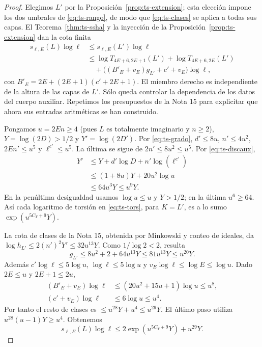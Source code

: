\begin{proof}
Elegimos $L'$ por la Proposición~\ref{prop:ts-extension}; esta elección impone los dos umbrales de \eqref{eq:ts-rango}, de modo que \eqref{eq:ts-clases} se aplica a todas sus capas. El Teorema~\ref{thm:ts-ssha} y la inyección de la Proposición~\ref{prop:ts-extension} dan la cota finita
\[
 \begin{aligned}
 s_{\ell,E}(L)\log\ell&\le s_{\ell,E}(L')\log\ell\\
 &\le\log T_{4E+6,2E+1}(L')+\log T_{4E+6,2E}(L')\\
 &\quad+\bigl((B'_E+v_E)g_{L'}+c'+v_E\bigr)\log\ell,
 \end{aligned}
\]
con $B'_E=2E+(2E+1)(c'+2E+1)$. El miembro derecho es independiente de la altura de las capas de $L'$. Sólo queda controlar la dependencia de los datos del cuerpo auxiliar. Repetimos los presupuestos de la Nota 15 para explicitar que ahora sus entradas aritméticas se han construido.

Pongamos $u=2En\ge4$ (pues $L$ es totalmente imaginario y $n\ge2$), $Y=\log(2D)>1/2$ y $Y'=\log(2D')$. Por \eqref{eq:ts-grado}, $d'\le8u$, $n'\le4u^2$, $2En'\le u^5$ y $\ell^{c'}\le u^5$. La última se sigue de $2n'\le8u^2\le u^5$. Por \eqref{eq:ts-discaux},
\[
 \begin{aligned}
 Y'&\le Y+d'\log D+n'\log(\ell^{c'})\\
 &\le(1+8u)Y+20u^2\log u\\
 &\le64u^3Y\le u^9Y.
 \end{aligned}
\]
En la penúltima desigualdad usamos $\log u\le u$ y $Y>1/2$; en la última $u^6\ge64$. Así cada logaritmo de torsión en \eqref{eq:ts-tors}, para $K=L'$, es a lo sumo $\exp(u^{5C_T+9}Y)$.

La cota de clases de la Nota 15, obtenida por Minkowski y conteo de ideales, da $\log h_{L'}\le2(n')^2Y'\le32u^{13}Y$. Como $1/\log2<2$, resulta
\[
 g_{L'}\le8u^2+2+64u^{13}Y\le81u^{13}Y\le u^{20}Y.
\]
Además $c'\log\ell\le5\log u$, $\log\ell\le5\log u$ y $v_E\log\ell\le\log E\le\log u$. Dado $2E\le u$ y $2E+1\le2u$,
\[
 \begin{aligned}
 (B'_E+v_E)\log\ell&\le(20u^2+15u+1)\log u\le u^8,\\
 (c'+v_E)\log\ell&\le6\log u\le u^4.
 \end{aligned}
\]
Por tanto el resto de clases es $\le u^{28}Y+u^4\le u^{29}Y$. El último paso utiliza $u^{28}(u-1)Y\ge u^4$. Obtenemos
\begin{equation}
 s_{\ell,E}(L)\log\ell\le2\exp(u^{5C_T+9}Y)+u^{29}Y.
 \label{eq:ts-sha-bound}
\end{equation}


\end{proof}
